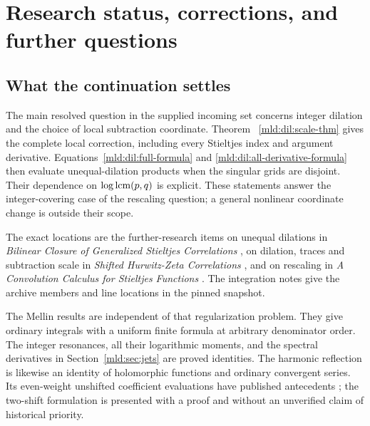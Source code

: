 \section{Research status, corrections, and further questions}
\label{mld:sec:research}

\subsection{What the continuation settles}

The main resolved question in the supplied incoming set concerns integer
dilation and the choice of local subtraction coordinate. Theorem~
\ref{mld:dil:scale-thm} gives the complete local correction, including every
Stieltjes index and argument derivative. Equations~\eqref{mld:dil:full-formula}
and \eqref{mld:dil:all-derivative-formula} then evaluate unequal-dilation
products when the singular grids are disjoint. Their dependence on
$\log\operatorname{lcm}(p,q)$ is explicit. These statements answer the integer-covering
case of the rescaling question; a general nonlinear coordinate change
is outside their scope.

The exact locations are the further-research items on unequal dilations
in \emph{Bilinear Closure of Generalized Stieltjes Correlations}
\cite{IncomingClosure}, on dilation, traces and subtraction scale in
\emph{Shifted Hurwitz-Zeta Correlations} \cite{IncomingShifted}, and on
rescaling in \emph{A Convolution Calculus for Stieltjes Functions}
\cite{IncomingCalculus}. The integration notes give the archive members
and line locations in the pinned snapshot.

The Mellin results are independent of that regularization problem.
They give ordinary integrals with a uniform finite formula at arbitrary
denominator order. The integer resonances, all their logarithmic moments,
and the spectral derivatives in Section~\ref{mld:sec:jets} are proved
identities. The harmonic reflection is likewise an identity of
holomorphic functions and ordinary convergent series. Its even-weight
unshifted coefficient evaluations have published antecedents
\cite{XuWang}; the two-shift formulation is presented with a proof and
without an unverified claim of historical priority.

